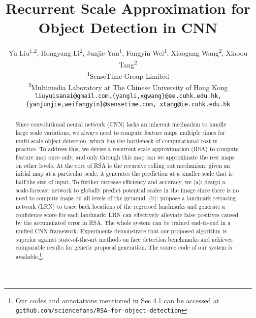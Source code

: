 \documentclass[10pt,twocolumn,letterpaper]{article}
\newcommand*{\affaddr}[1]{#1} \newcommand*{\affmark}[1][*]{\textsuperscript{#1}}
\newcommand*{\email}[1]{\texttt{#1}}
\begin{document}
\title{Recurrent Scale Approximation for Object Detection in CNN}


\author{Yu Liu\affmark[1,2], Hongyang Li\affmark[2], Junjie Yan\affmark[1], Fangyin Wei\affmark[1], Xiaogang Wang\affmark[2], Xiaoou Tang\affmark[2]\\
	\vspace{-.2cm}
\affaddr{\affmark[1]SenseTime Group Limited}\\
\affaddr{\affmark[2]Multimedia Laboratory at The Chinese University of Hong Kong}\\
\email{liuyuisanai@gmail.com,\{yangli,xgwang\}@ee.cuhk.edu.hk, \{yanjunjie,weifangyin\}@sensetime.com, xtang@ie.cuhk.edu.hk}
}



\maketitle




\vspace{-0.3cm}
\begin{abstract}




Since convolutional neural network (CNN) lacks an inherent mechanism to handle large scale variations, we always need to compute feature maps multiple times for multi-scale object detection, which has the bottleneck of computational cost in practice.
To address this, we devise a recurrent scale approximation (RSA) to compute feature map once only, and only through this map can we approximate the rest maps on other levels. At the core of RSA is the recursive rolling out mechanism: given an initial map at a particular scale, it  generates the prediction at a smaller scale that is half the size of input.
To further increase efficiency and accuracy, we (a): design a scale-forecast network to globally predict potential scales in the image 
since there is no need to compute maps on all levels of the pyramid. 
(b): propose a landmark retracing network (LRN) to trace back locations of the regressed landmarks and generate a confidence score for each landmark; LRN can effectively alleviate false positives caused by the accumulated error in RSA.
The whole system can be trained end-to-end in a unified CNN framework. 
Experiments demonstrate that our proposed algorithm is superior against state-of-the-art methods on face detection benchmarks and achieves comparable results for generic proposal generation. The source code of our system is available.\footnote{Our codes and annotations mentioned in Sec.4.1 can be accessed at {\color{Rhodamine} \texttt{github.com/sciencefans/RSA-for-object-detection}}}. 

      
\end{abstract}
\vspace{-.2cm}
\end{document}
